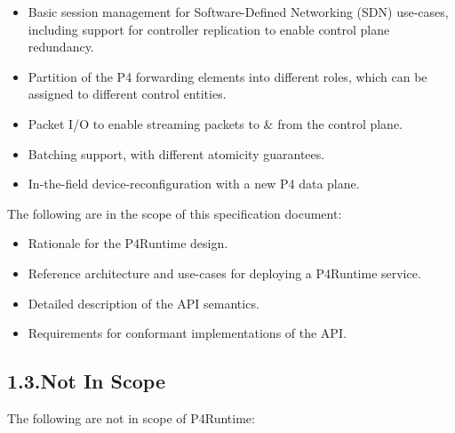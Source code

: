 \documentclass[11pt]{article}
\begin{document}
{\begin{itemize}[noitemsep,topsep=\mdcompacttopsep]
\item{}Basic session management for Software-Defined Networking (SDN) use-cases,
including support for controller replication to enable control plane
redundancy.%

\item{}Partition of the P4 forwarding elements into different roles, which can be
assigned to different control entities.%

\item{}Packet I/O to enable streaming packets to \& from the control plane.%

\item{}Batching support, with different atomicity guarantees.%

\item{}In-the-field device-reconfiguration with a new P4 data plane.%
\end{itemize}%

\noindent{}The following are in the scope of this specification document:%

\begin{itemize}[noitemsep,topsep=\mdcompacttopsep]%

\item{}Rationale for the P4Runtime design.%

\item{}Reference architecture and use-cases for deploying a P4Runtime service.%

\item{}Detailed description of the API semantics.%

\item{}Requirements for conformant implementations of the API.%
\end{itemize}%

\subsection{1.3.\hspace*{0.5em}Not In Scope}\label{sec-not-in-scope}%

\noindent{}The following are not in scope of P4Runtime:%

}
\end{document}
